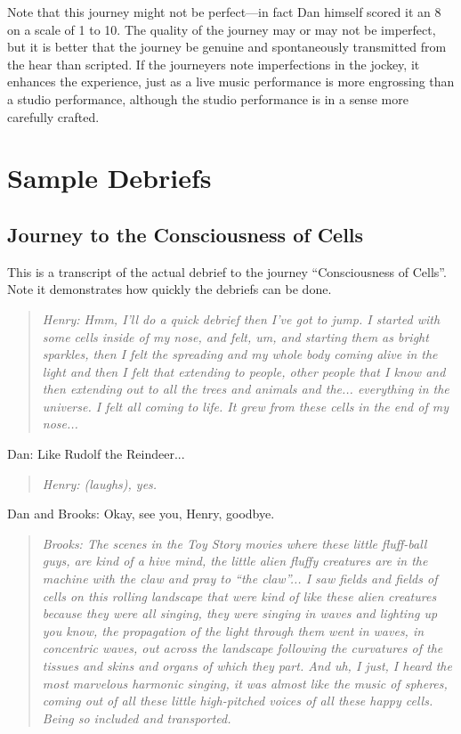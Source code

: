 \documentclass[12pt]{book}
\begin{document}
\hrulefill

Note that this journey might not be perfect---in fact Dan himself
scored it an 8 on a scale of 1 to 10. The quality of the journey
may or may not be imperfect, but it is better that the
journey be genuine and spontaneously transmitted from the
hear than scripted. If the journeyers note imperfections
in the jockey, it enhances the experience, just as a live
music performance is more engrossing than a studio performance,
although the studio performance is in a sense more carefully crafted.

\chapter{Sample Debriefs}

\section{Journey to the Consciousness of Cells}

This is a transcript of the actual debrief to the journey
``Consciousness of Cells''. Note it demonstrates how
quickly the debriefs can be done.

\begin{quote}{\em
Henry: Hmm, I'll do a quick debrief then I've got to jump.
I started with some cells inside of my nose, and felt, um,
and starting them as bright sparkles, then I felt the spreading
and my whole body coming alive in the light and then I felt
that extending to people, other people that I know and
then extending out to all the trees and animals and the...
everything in the universe. I felt all coming to life.
It grew from these cells in the end of my nose...
}\end{quote}

Dan: Like Rudolf the Reindeer...

\begin{quote}{\em
Henry: (laughs), yes.
}\end{quote}    

Dan and Brooks: Okay,  see you, Henry, goodbye.


\begin{quote}{\em
Brooks:  The scenes in the Toy Story movies where these
little fluff-ball guys, are kind of a hive mind,
the little alien fluffy creatures are in the machine
with the claw and pray to ``the claw''...
I saw fields and fields of cells on this rolling landscape
that were kind of like these alien creatures because they
were all singing, they were singing in waves and lighting up
you know, the propagation of the light through them went
in waves, in concentric waves, out across the landscape
following the curvatures of the tissues and skins and organs
of which they part. And uh, I just,  I heard the most marvelous harmonic
singing, it was almost like the music of spheres,
coming out of all these little high-pitched voices 
of all these happy cells.
Being so included and transported.
}\end{quote}
\end{document}
